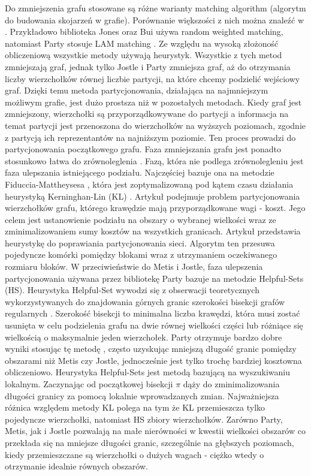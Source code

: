 Do zmniejszenia grafu stosowane są różne warianty matching algorithm (algorytm do budowania skojarzeń w grafie).
Porównanie większości z nich można znaleźć w \cite{Analysis}.
Przykładowo biblioteka Jones oraz Bui \cite{Bui1993AHF} używa random weighted matching, natomiast Party \cite{1364754}
stosuje LAM matching \cite{weighted_maching}.
Ze względu na wysoką złożoność obliczeniową wszystkie metody używają heurystyk.
Wszystkie z tych metod zmniejszają graf, jednak tylko Jostle i Party zmniejsza graf,
aż do otrzymania liczby wierzchołków równej liczbie partycji, na które chcemy podzielić wejściowy graf.
Dzięki temu metoda partycjonowania, działająca na najmniejszym możliwym grafie, jest dużo prostsza niż w pozostałych metodach.
Kiedy graf jest zmniejszony, wierzchołki są przyporządkowywane do partycji a informacja na temat partycji jest przenoszona
do wierzchołków na wyższych poziomach, zgodnie z partycją ich reprezentantów na najniższym poziomie.
Ten proces prowadzi do partycjonowania początkowego grafu.
Faza zmniejszania grafu jest ponadto stosunkowo łatwa do zrównoleglenia \cite{KARYPIS199871}.
Fazą, która nie podlega zrównolegleniu jest faza ulepszania istniejącego podziału.
Najczęściej bazuje ona na metodzie Fiduccia-Mattheysesa \cite{10.5555/800263.809204},
która jest zoptymalizowaną pod kątem czasu działania heurystyką Kerninghan-Lin (KL) \cite{6771089}.
Artykuł \cite{6771089} podejmuje problem partycjonowania wierzchołków grafu, którego krawędzie mają
przyporządkowane wagi - koszt.
Jego celem jest ustanowienie podziału na obszary o wybranej wielkości wraz
ze zminimalizowaniem sumy kosztów na wszystkich granicach.
Artykuł \cite{10.5555/800263.809204} przedstawia heurystykę do poprawiania partycjonowania sieci.
Algorytm ten przesuwa pojedyncze komórki pomiędzy blokami wraz z utrzymaniem oczekiwanego rozmiaru bloków.
W przeciwieństwie do Metis i Jostle, faza ulepszenia partycjonowania używana przez bibliotekę Party bazuje na metodzie
Helpful-Sets (HS).
Heurystyka Helpful-Set wywodzi się z obserwacji teoretycznych wykorzystywanych do znajdowania górnych
granic szerokości bisekcji grafów regularnych \cite{10.1007/3-540-54345-7_64, MONIEN2006475}.
Szerokość bisekcji to minimalna liczba krawędzi, która musi zostać usunięta w celu podzielenia grafu na
dwie równej wielkości części lub różniące się wielkością o maksymalnie jeden wierzchołek.
Party otrzymuje bardzo dobre wyniki stosując tę metodę \cite{10.1007/3-540-44842-X_6}, często uzyskując mniejszą długość
granic pomiędzy obszarami niż Metis czy Jostle, jednocześnie jest tylko trochę bardziej kosztowna obliczeniowo.
Heurystyka Helpful-Sets jest metodą bazującą na wyszukiwaniu lokalnym.
Zaczynając od początkowej bisekcji \(\pi\) dąży
do zminimalizowania długości granicy za pomocą lokalnie wprowadzanych zmian.
Najważniejsza różnica względem metody KL polega na tym że KL przemieszcza tylko pojedyncze wierzchołki,
natomiast HS zbiory wierzchołków.
Zarówno Party, Metis, jak i Jostle pozwalają na małe nierówności w kwestii wielkości obszarów co przekłada się na
mniejsze długości granic,
szczególnie na głębszych poziomach, kiedy przemieszczane są wierzchołki o dużych wagach - ciężko wtedy o otrzymanie
idealnie równych obszarów.

